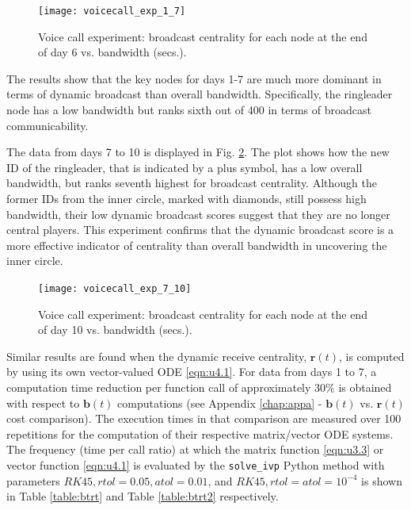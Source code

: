 \begin{figure}[h]\centering
    \texttt{[image: voicecall\_exp\_1\_7]}
    \caption{Voice call experiment: broadcast centrality for each node at the end of day 6 vs. bandwidth (secs.).}
    \label{fig:ve1a}
    \bigskip
\end{figure}

The results show that the key nodes for days 1-7 are much more dominant in terms of dynamic broadcast than overall bandwidth. Specifically, the ringleader node has a low bandwidth but ranks sixth out of 400 in terms of broadcast communicability.

The data from days 7 to 10 is displayed in Fig. \ref{fig:ve1b}. The plot shows how the new ID of the ringleader, that is indicated by a plus symbol, has a low overall bandwidth, but ranks seventh highest for broadcast centrality. Although the former IDs from the inner circle, marked with diamonds, still possess high bandwidth, their low dynamic broadcast scores suggest that they are no longer central players. This experiment confirms that the dynamic broadcast score is a more effective indicator of centrality than overall bandwidth in uncovering the inner circle.

\begin{figure}[h]\centering
    \texttt{[image: voicecall\_exp\_7\_10]}
    \caption{Voice call experiment: broadcast centrality for each node at the end of day 10 vs. bandwidth (secs.).}
    \label{fig:ve1b}
    \bigskip
\end{figure}

Similar results are found when the dynamic receive centrality, $\mathbf{r}(t)$, is computed by using its own vector-valued ODE \eqref{eqn:u4.1}. For data from days 1 to 7, a computation time reduction per function call of approximately $30\%$ is obtained with respect to $\mathbf{b}(t)$ computations (see Appendix \ref{chap:appa} - $\mathbf{b}(t)$ vs. $\mathbf{r}(t)$ cost comparison). The execution times in that comparison are measured over 100 repetitions for the computation of their respective matrix/vector ODE systems. The frequency (time per call ratio) at which the matrix function \eqref{eqn:u3.3} or vector function \eqref{eqn:u4.1} is evaluated by the \texttt{solve\_ivp} Python method with parameters $RK45, rtol=0.05, atol=0.01$, and $RK45, rtol=atol=10^{-4}$ is shown in Table \ref{table:btrt} and Table \ref{table:btrt2} respectively.

